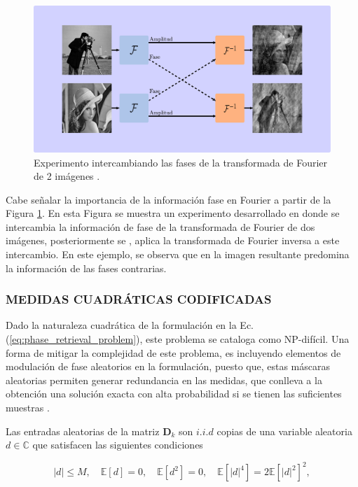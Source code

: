 \begin{figure}[H]
    \centering
    \includegraphics[width=0.8\linewidth]{images/mescla_abs_fase.pdf}
    \caption{\hspace{2mm}Experimento  intercambiando las fases de la transformada de Fourier de 2 imágenes .}
    \label{fig:mescla_fases}
\end{figure}

Cabe señalar la importancia de la información fase en Fourier a partir de la Figura \ref{fig:mescla_fases}. En esta Figura se muestra un experimento desarrollado en \cite{shechtman2015phase} donde se intercambia la información de fase de la transformada de Fourier de dos imágenes, posteriormente se , aplica la transformada de Fourier inversa a este intercambio. En este ejemplo, se observa que en la imagen resultante predomina la información de las fases contrarias.

\subsubsection{MEDIDAS CUADRÁTICAS CODIFICADAS}
Dado la naturaleza cuadrática de la formulación en la Ec. (\ref{eq:phase_retrieval_problem}), este problema se cataloga como NP-difícil. Una forma de mitigar la complejidad de este problema, es incluyendo elementos de modulación de fase aleatorios en la formulación, puesto que, estas máscaras aleatorias permiten generar redundancia en las medidas, que conlleva a la obtención una solución exacta con alta probabilidad si se tienen las suficientes muestras \cite{candes_CDP}.

Las entradas aleatorias de la matriz  $\mathbf{D}_k$ son $i.i.d$ copias de una variable aleatoria $d \in \mathbb{C}$ que satisfacen las siguientes condiciones

\begin{equation}
    \vert d \vert \leq M, \quad \mathbb{E}[d] = 0, \quad  \mathbb{E}[d^2] = 0, \quad  \mathbb{E}[\vert d \vert^4] = 2\mathbb{E}[\vert d \vert^2]^2,    
    \label{eq:restricciones_mascara}
\end{equation}

